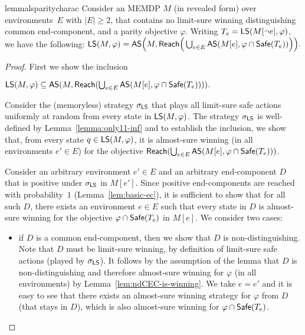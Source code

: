\documentclass[a4paper,USenglish,cleveref, autoref, thm-restate]{lipics-v2021}
\def\abs#1{\ensuremath{\lvert #1 \rvert}}
\newcommand\almostsure{\textrm{\sf AS}}
\newcommand\limitsure{\textrm{\sf LS}}
\newcommand\Safe{\textrm{\sf Safe}}
\newcommand\Reach{\textrm{\sf Reach}}
\begin{document}
\begin{restatable}{lemma}{lsparitycharac}
\label{lemma:ls-parity-charac}
Consider an MEMDP $M$ (in revealed form) over environments~$E$ with $\abs{E} \geq 2$,
that contains no limit-sure winning distinguishing common end-component, and a parity objective $\varphi$. 
Writing $T_e = \limitsure(M[\lnot e], \varphi)$, we have the following:
\(
   \limitsure(M, \varphi) = \almostsure\Big(M, \Reach\Big(\bigcup_{e \in E} \almostsure(M[e], \varphi \cap \Safe(T_e)) \Big)\Big).
\)

\end{restatable}


\begin{proof}
First we show the inclusion 
\begin{center}
$\limitsure(M, \varphi) \subseteq \almostsure(M, \Reach(\bigcup_{e \in E} \almostsure(M[e], \varphi \cap \Safe(T_e)))).$
\end{center}
Consider the (memoryless) strategy $\sigma_{\limitsure}$ that plays all 
limit-sure safe actions uniformly at random from every state in $\limitsure(M, \varphi)$. 
The strategy $\sigma_{\limitsure}$ is well-defined by Lemma~\ref{lemma:only11-inf} and 
to establish the inclusion, we show that, from every state $q \in \limitsure(M, \varphi)$,
it is almost-sure winning (in all environments $e' \in E$) for the objective 
$\Reach(\bigcup_{e \in E} \almostsure(M[e], \varphi \cap \Safe(T_e)))$. 

Consider an arbitrary environment $e' \in E$ and an arbitrary 
end-component $D$ that is positive under $\sigma_{\limitsure}$ in $M[e']$. 
Since positive end-components are reached with probability~$1$ (Lemma~\ref{lem:basic-ec}), it is sufficient
to show that for all such $D$, there exists an environment $e \in E$ such that 
every state in $D$ is almost-sure winning for the objective $\varphi \cap \Safe(T_e)$
in $M[e]$. We consider two cases:

\begin{itemize}
\item if $D$ is a common end-component, then we show that $D$ is non-distinguishing.
Note that $D$ must be limit-sure winning, by definition of limit-sure safe actions (played by $\sigma_{\limitsure}$).
It follows by the assumption of the lemma that $D$ is non-distinguishing
and therefore almost-sure winning for $\varphi$ (in all environments) by Lemma~\ref{lem:ndCEC-is-winning}.
We take $e = e'$ and it is easy to see that there exists an almost-sure winning strategy 
for $\varphi$ from $D$ (that stays in $D$), which is also almost-sure winning 
for $\varphi \cap \Safe(T_e)$.


\end{itemize}
\end{proof}
\end{document}
